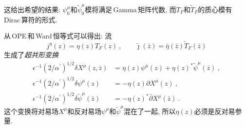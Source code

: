 这给出希望的结果: $\psi_{0}^{\mu} $和$ \tilde{\psi}_{0}^{\mu} $模将满足\,Gamma\,矩阵代数, 而$ T_{F} $和$ \tilde{T}_{F} $的质心模有\,Dirac\,算符的形式. 

从\,OPE\,和\,Ward\,恒等式可以得出: 流
\begin{equation}
    j^{\eta}(z)=\eta(z)T_{F}(z)\:, \qquad
    \tilde{\jmath}(\bar{z})=\bar{\eta}(\bar{z}) \tilde{T}_{F}(\bar{z}) \label{10.1.9}
\end{equation}
生成了{\emph{超共形变换}}
\begin{subequations}
\begin{align}
     \epsilon^{-1}(2/\alpha^{\prime})^{1/2}\delta X^{\mu}(z,\bar{z}) &= \eta(z)\psi^{\mu}(z) + \eta(z)^{\ast} \tilde{\psi}^{\mu}(\bar{z})\:, \label{10.1.10a} \\
      \epsilon^{-1}(2/\alpha^{\prime})^{1/2}\delta \psi^{\mu}(z) &= -\eta(z)\partial X^{\mu}(z) \:, \label{10.1.10b}  \\
      \epsilon^{-1}(2/\alpha^{\prime})^{1/2}\delta\tilde{\psi}^{\mu}(\bar{z}) &=-\eta(z)^{\ast}\bar{\partial} X^{\mu}(\bar{z}) \:. \label{10.1.10c}
\end{align}
\end{subequations}
这个变换将对易场$ X^{\mu} $和反对易场$ \psi^{\mu} $和$ \tilde{\psi}^{\mu} $混在了一起, 所以$ \eta(z) $必须是反对易参量. 

